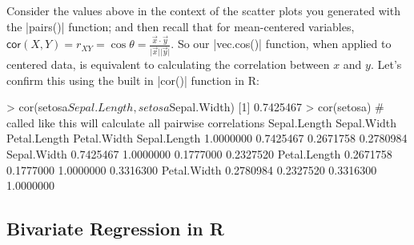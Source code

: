 Consider the values above in the context of the scatter plots you generated with the |pairs()| function; and then recall that for mean-centered variables, $\mathsf{cor}(X,Y) = r_{XY} = \cos \theta = \frac{\vec{x} \cdot \vec{y}}{\vert \vec{x}\vert \vert \vec{y} \vert}$.  So our |vec.cos()| function, when applied to centered data, is equivalent to calculating the correlation between $x$ and $y$.  Let's confirm this using the built in |cor()| function in R:
\begin{R}
> cor(setosa$Sepal.Length, setosa$Sepal.Width)
[1] 0.7425467
> cor(setosa)  # called like this will calculate all pairwise correlations
             Sepal.Length Sepal.Width Petal.Length Petal.Width
Sepal.Length    1.0000000   0.7425467    0.2671758   0.2780984
Sepal.Width     0.7425467   1.0000000    0.1777000   0.2327520
Petal.Length    0.2671758   0.1777000    1.0000000   0.3316300
Petal.Width     0.2780984   0.2327520    0.3316300   1.0000000
\end{R}


\subsection{Bivariate Regression in R}

